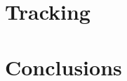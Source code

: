 \documentclass{article} %
\begin{document}
\section{Tracking}
\label{sec:tracking}


\clearpage
\section{Conclusions}
\label{sec:conclusions}


\end{document}

